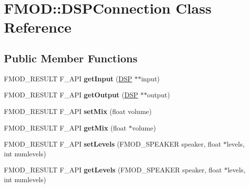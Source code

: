 \hypertarget{class_f_m_o_d_1_1_d_s_p_connection}{}\section{F\+M\+OD\+:\+:D\+S\+P\+Connection Class Reference}
\label{class_f_m_o_d_1_1_d_s_p_connection}
\subsection*{Public Member Functions}
\begin{DoxyCompactItemize}
\item 
F\+M\+O\+D\+\_\+\+R\+E\+S\+U\+LT F\+\_\+\+A\+PI {\bfseries get\+Input} (\hyperlink{class_f_m_o_d_1_1_d_s_p}{D\+SP} $\ast$$\ast$input)\hypertarget{class_f_m_o_d_1_1_d_s_p_connection_a4885524212e3f791debfac1ec259ee6a}{}\label{class_f_m_o_d_1_1_d_s_p_connection_a4885524212e3f791debfac1ec259ee6a}

\item 
F\+M\+O\+D\+\_\+\+R\+E\+S\+U\+LT F\+\_\+\+A\+PI {\bfseries get\+Output} (\hyperlink{class_f_m_o_d_1_1_d_s_p}{D\+SP} $\ast$$\ast$output)\hypertarget{class_f_m_o_d_1_1_d_s_p_connection_a813e7b67af3dcf1fad6b8ed73ad99a8d}{}\label{class_f_m_o_d_1_1_d_s_p_connection_a813e7b67af3dcf1fad6b8ed73ad99a8d}

\item 
F\+M\+O\+D\+\_\+\+R\+E\+S\+U\+LT F\+\_\+\+A\+PI {\bfseries set\+Mix} (float volume)\hypertarget{class_f_m_o_d_1_1_d_s_p_connection_a67b8373d3bead0903909ac035acfa47d}{}\label{class_f_m_o_d_1_1_d_s_p_connection_a67b8373d3bead0903909ac035acfa47d}

\item 
F\+M\+O\+D\+\_\+\+R\+E\+S\+U\+LT F\+\_\+\+A\+PI {\bfseries get\+Mix} (float $\ast$volume)\hypertarget{class_f_m_o_d_1_1_d_s_p_connection_a21bceb2d4e9d4f951c137d7a2bc95572}{}\label{class_f_m_o_d_1_1_d_s_p_connection_a21bceb2d4e9d4f951c137d7a2bc95572}

\item 
F\+M\+O\+D\+\_\+\+R\+E\+S\+U\+LT F\+\_\+\+A\+PI {\bfseries set\+Levels} (F\+M\+O\+D\+\_\+\+S\+P\+E\+A\+K\+ER speaker, float $\ast$levels, int numlevels)\hypertarget{class_f_m_o_d_1_1_d_s_p_connection_a4ff2362aa7cfb0b5397919ca97f27d60}{}\label{class_f_m_o_d_1_1_d_s_p_connection_a4ff2362aa7cfb0b5397919ca97f27d60}

\item 
F\+M\+O\+D\+\_\+\+R\+E\+S\+U\+LT F\+\_\+\+A\+PI {\bfseries get\+Levels} (F\+M\+O\+D\+\_\+\+S\+P\+E\+A\+K\+ER speaker, float $\ast$levels, int numlevels)\hypertarget{class_f_m_o_d_1_1_d_s_p_connection_aa3a1e3bb3228c2bfdfba033657574013}{}\label{class_f_m_o_d_1_1_d_s_p_connection_aa3a1e3bb3228c2bfdfba033657574013}


\end{DoxyCompactItemize}
